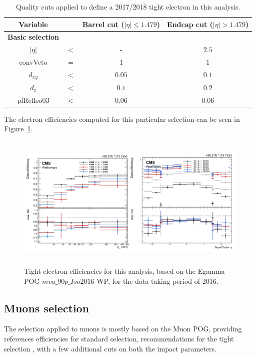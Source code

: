 \documentclass[a4paper, 10pt, openright]{report}
\begin{document}
\begin{table}
\begin{center}
\begin{tabular}{ c|c|c|c } 
 \hline
 Variable & & Barrel cut ($|\eta| \leq 1.479$) & Endcap cut ($|\eta| > 1.479$) \\
\hline
\textbf{Basic selection} & &  \\ 
 $|\eta|$ & $<$ & - & $2.5$ \\
 convVeto & $=$ & 1 & 1 \\
 $d_{xy}$ & $<$ &  $0.05$ & $0.1$ \\
 $d_z$ & $<$ & $0.1$ & $0.2$ \\
 pfRelIso03 & $<$ & $0.06$ & $0.06$ \\
\hline
\end{tabular}
\caption{Quality cuts applied to define a 2017/2018 tight electron in this analysis.}
\label{table:EleWP20178}
\end{center}
\end{table}	

The electron efficiencies computed for this particular selection can be seen in Figure~\ref{fig:EleEff}.

\begin{figure}[htbp]
\centering
\includegraphics[width=14cm, height=6.5cm]{figs/EleEff.png}
\caption{Tight electron efficiencies for this analysis, based on the Egamma \ac{POG} $mva\_90p\_Iso2016$ \ac{WP}, for the data taking period of 2016.}
\label{fig:EleEff}
\end{figure}

\subsection{Muons selection} \label{section:MuSel}

The selection applied to muons is mostly based on the Muon \ac{POG}, providing references efficiencies for standard selection, recommendations for the tight selection \cite{MuonPOG}, with a few additional cuts on both the impact parameters. 
\end{document}
